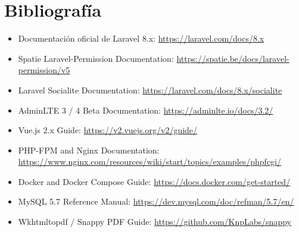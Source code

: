 \chapter{Bibliografía}
\begin{itemize}
    \item Documentación oficial de Laravel 8.x: \url{https://laravel.com/docs/8.x}
    \item Spatie Laravel-Permission Documentation: \url{https://spatie.be/docs/laravel-permission/v5}
    \item Laravel Socialite Documentation: \url{https://laravel.com/docs/8.x/socialite}
    \item AdminLTE 3 / 4 Beta Documentation: \url{https://adminlte.io/docs/3.2/}
    \item Vue.js 2.x Guide: \url{https://v2.vuejs.org/v2/guide/}
    \item PHP-FPM and Nginx Documentation: \url{https://www.nginx.com/resources/wiki/start/topics/examples/phpfcgi/}
    \item Docker and Docker Compose Guide: \url{https://docs.docker.com/get-started/}
    \item MySQL 5.7 Reference Manual: \url{https://dev.mysql.com/doc/refman/5.7/en/}
    \item Wkhtmltopdf / Snappy PDF Guide: \url{https://github.com/KnpLabs/snappy}
\end{itemize}
